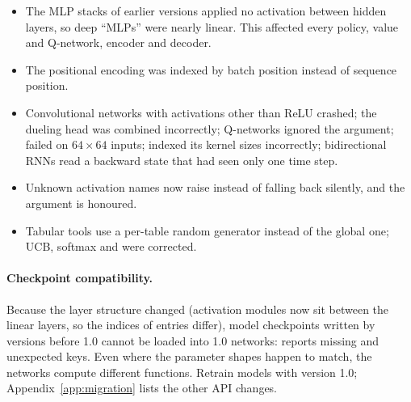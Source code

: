 \begin{itemize}
  \item The MLP stacks of earlier versions applied no activation between
    hidden layers, so deep ``MLPs'' were nearly linear. This affected every
    policy, value and Q-network, encoder and decoder.
  \item The positional encoding was indexed by batch position instead of
    sequence position.
  \item Convolutional networks with activations other than ReLU crashed; the
    dueling head was combined incorrectly; Q-networks ignored the
     argument;  failed on $64 \times 64$ inputs;
     indexed its kernel sizes incorrectly; bidirectional RNNs
    read a backward state that had seen only one time step.
  \item Unknown activation names now raise instead of falling back silently,
    and the  argument is honoured.
  \item Tabular tools use a per-table random generator instead of the global
    one; UCB, softmax and  were corrected.
\end{itemize}

\paragraph{Checkpoint compatibility.}
Because the layer structure changed (activation modules now sit between the
linear layers, so the indices of  entries differ), model
checkpoints written by versions before 1.0 cannot be loaded into 1.0 networks:
 reports missing and unexpected keys. Even where the
parameter shapes happen to match, the networks compute different functions.
Retrain models with version 1.0; Appendix~\ref{app:migration} lists the other
API changes.

\par\endgroup
